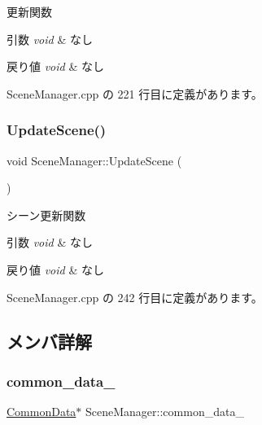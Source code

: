 更新関数 


\begin{DoxyParams}{引数}
{\em void} & なし \\
\hline
\end{DoxyParams}

\begin{DoxyRetVals}{戻り値}
{\em void} & なし \\
\hline
\end{DoxyRetVals}


 Scene\+Manager.\+cpp の 221 行目に定義があります。

\mbox{\label{class_scene_manager_a493bc0d65558ce004f6f248a185ba956}} 
\subsubsection{\texorpdfstring{Update\+Scene()}{UpdateScene()}}
{\footnotesize\ttfamily void Scene\+Manager\+::\+Update\+Scene (\begin{DoxyParamCaption}{ }\end{DoxyParamCaption})}



シーン更新関数 


\begin{DoxyParams}{引数}
{\em void} & なし \\
\hline
\end{DoxyParams}

\begin{DoxyRetVals}{戻り値}
{\em void} & なし \\
\hline
\end{DoxyRetVals}


 Scene\+Manager.\+cpp の 242 行目に定義があります。



\subsection{メンバ詳解}
\mbox{\label{class_scene_manager_a5f0f0da3d7f9a8a94f0b5a20c3a4908a}} 
\subsubsection{\texorpdfstring{common\+\_\+data\+\_\+}{common\_data\_}}
{\footnotesize\ttfamily \mbox{\hyperlink{class_scene_manager_1_1_common_data}{Common\+Data}}$\ast$ Scene\+Manager\+::common\+\_\+data\+\_\+\hspace{0.3cm}{\ttfamily [private]}}



